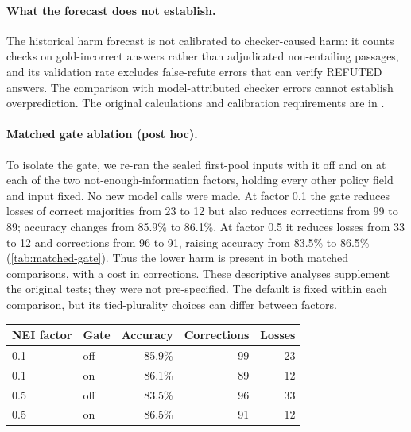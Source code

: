 \par\medskip\noindent
\begin{minipage}{\linewidth}
\paragraph{What the forecast does not establish.} The historical harm forecast is not calibrated to checker-caused harm: it counts checks on gold-incorrect answers rather than adjudicated non-entailing passages, and its validation rate excludes false-refute errors that can verify REFUTED answers. The comparison with model-attributed checker errors cannot establish overprediction. The original calculations and calibration requirements are in .
\par
\end{minipage}
\par


\par\medskip\noindent
\begin{minipage}{\linewidth}
\paragraph{Matched gate ablation (post hoc).} To isolate the gate, we re-ran the sealed first-pool inputs with it off and on at each of the two not-enough-information factors, holding every other policy field and input fixed. No new model calls were made. At factor 0.1 the gate reduces losses of correct majorities from 23 to 12 but also reduces corrections from 99 to 89; accuracy changes from 85.9\% to 86.1\%. At factor 0.5 it reduces losses from 33 to 12 and corrections from 96 to 91, raising accuracy from 83.5\% to 86.5\% (\cref{tab:matched-gate}). Thus the lower harm is present in both matched comparisons, with a cost in corrections. These descriptive analyses supplement the original tests; they were not pre-specified. The default is fixed within each comparison, but its tied-plurality choices can differ between factors.

\begin{center}
\begin{minipage}{\linewidth}
  \centering
  \captionsetup{hypcap=false}
  \label{tab:matched-gate}
  \small
  \begin{tabular}{@{}llrrr@{}}
    \toprule
    NEI factor & Gate & Accuracy & Corrections & Losses \\
    \midrule
    0.1 & off & 85.9\% & 99 & 23 \\
    0.1 & on  & 86.1\% & 89 & 12 \\
    0.5 & off & 83.5\% & 96 & 33 \\
    0.5 & on  & 86.5\% & 91 & 12 \\
    \bottomrule
  \end{tabular}
\end{minipage}
\end{center}
\par
\end{minipage}
\par

